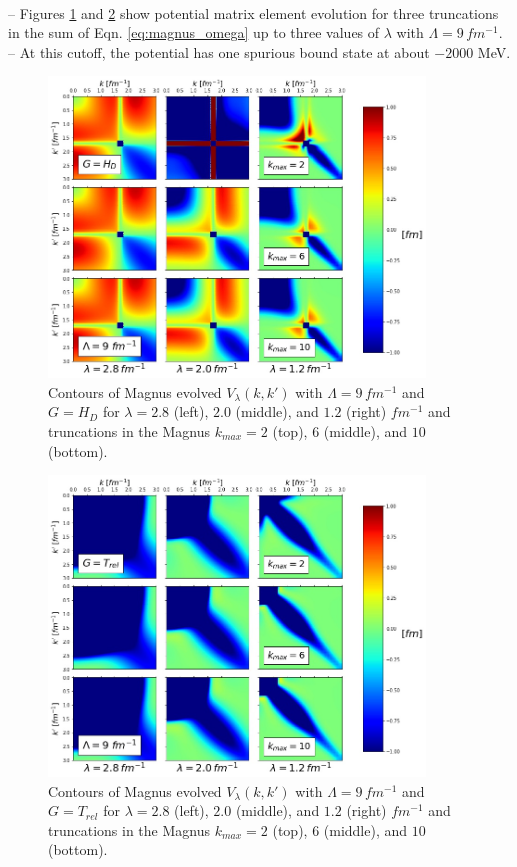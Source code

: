 \documentclass[preprintnumbers,floatfix,aps,prc,preprint,nofootinbib]{revtex4-1}
\begin{document}
\\
-- Figures \ref{fig:magnus_contours_Wendt_Lamb9_Wegner} and \ref{fig:magnus_contours_Wendt_Lamb9_T} show potential matrix element evolution for three truncations in the sum of Eqn. \ref{eq:magnus_omega} up to three values of $\lambda$ with $\Lambda=9 \, fm^{-1}$.
\\
-- At this cutoff, the potential has one spurious bound state at about $-2000$ MeV.
\\
%	
\begin{figure}
	\captionsetup{singlelinecheck=false,justification=raggedright}
	\centering
	\includegraphics[width=10cm]{magnus_contours_Wendt_Lamb9_Wegner}
	\hspace*{0.05\textwidth}
	\caption{Contours of Magnus evolved $V_{\lambda}(k,k')$ with $\Lambda=9 \, fm^{-1}$ and $G=H_{D}$ for $\lambda=2.8$ (left), $2.0$ (middle), and $1.2$ (right) $fm^{-1}$ and truncations in the Magnus $k_{max}=2$ (top), $6$ (middle), and $10$ (bottom).}
	\label{fig:magnus_contours_Wendt_Lamb9_Wegner}
\end{figure}
%
\begin{figure}
	\captionsetup{singlelinecheck=false,justification=raggedright}
	\centering
	\includegraphics[width=10cm]{magnus_contours_Wendt_Lamb9_T}
  	\hspace*{0.05\textwidth}
  	\caption{Contours of Magnus evolved $V_{\lambda}(k,k')$ with $\Lambda=9 \, fm^{-1}$ and $G=T_{rel}$ for $\lambda=2.8$ (left), $2.0$ (middle), and $1.2$ (right) $fm^{-1}$ and truncations in the Magnus $k_{max}=2$ (top), $6$ (middle), and $10$ (bottom).}
  	\label{fig:magnus_contours_Wendt_Lamb9_T}
\end{figure}
\end{document}
